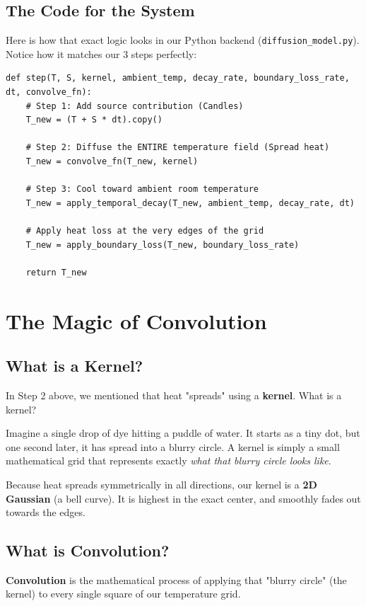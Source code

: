 \documentclass[11pt]{book}
\begin{document}
\section{The Code for the System}
Here is how that exact logic looks in our Python backend (\texttt{diffusion\_model.py}). Notice how it matches our 3 steps perfectly:

\begin{minipage}{\linewidth}
\begin{lstlisting}
def step(T, S, kernel, ambient_temp, decay_rate, boundary_loss_rate, dt, convolve_fn):
    # Step 1: Add source contribution (Candles)
    T_new = (T + S * dt).copy()
    
    # Step 2: Diffuse the ENTIRE temperature field (Spread heat)
    T_new = convolve_fn(T_new, kernel)
    
    # Step 3: Cool toward ambient room temperature
    T_new = apply_temporal_decay(T_new, ambient_temp, decay_rate, dt)
    
    # Apply heat loss at the very edges of the grid
    T_new = apply_boundary_loss(T_new, boundary_loss_rate)
    
    return T_new
\end{lstlisting}
\end{minipage}

\chapter{The Magic of Convolution}
\section{What is a Kernel?}
In Step 2 above, we mentioned that heat "spreads" using a \textbf{kernel}. What is a kernel?

Imagine a single drop of dye hitting a puddle of water. It starts as a tiny dot, but one second later, it has spread into a blurry circle. A kernel is simply a small mathematical grid that represents exactly \textit{what that blurry circle looks like}. 

Because heat spreads symmetrically in all directions, our kernel is a \textbf{2D Gaussian} (a bell curve). It is highest in the exact center, and smoothly fades out towards the edges. 

\section{What is Convolution?}
\textbf{Convolution} is the mathematical process of applying that "blurry circle" (the kernel) to every single square of our temperature grid. 
\end{document}
